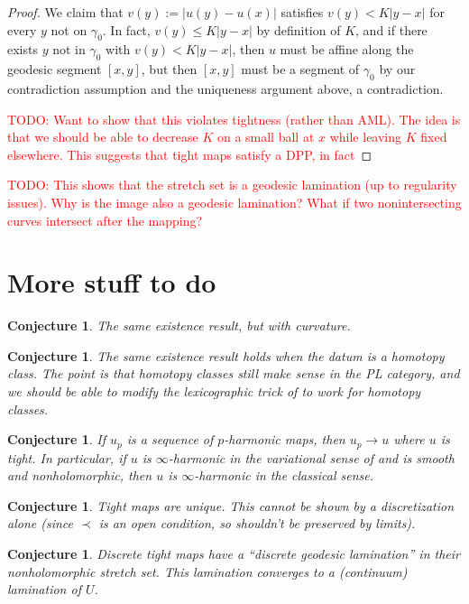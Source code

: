 \documentclass[reqno,11pt]{amsart}
\newtheorem{conjecture}[theorem]{Conjecture}
\theoremstyle{definition}
\numberwithin{equation}{section}
\newcommand\todo[1]{\textcolor{red}{TODO: #1}}
\begin{document}
\begin{proof}
We claim that $v(y) := |u(y) - u(x)|$ satisfies $v(y) < K|y - x|$ for every $y$ not on $\gamma_0$.
In fact, $v(y) \leq K|y - x|$ by definition of $K$, and if there exists $y$ not in $\gamma_0$ with $v(y) < K|y - x|$, then $u$ must be affine along the geodesic segment $[x, y]$, but then $[x, y]$ must be a segment of $\gamma_0$ by our contradiction assumption and the uniqueness argument above, a contradiction.

\todo{Want to show that this violates tightness (rather than AML).
The idea is that we should be able to decrease $K$ on a small ball at $x$ while leaving $K$ fixed elsewhere.
This suggests that tight maps satisfy a DPP, in fact}
\end{proof}

\todo{This shows that the stretch set is a geodesic lamination (up to regularity issues).
Why is the image also a geodesic lamination? What if two nonintersecting curves intersect after the mapping?}


\section{More stuff to do}
\begin{conjecture}
The same existence result, but with curvature.
\end{conjecture}

\begin{conjecture}
The same existence result holds when the datum is a homotopy class.
The point is that homotopy classes still make sense in the PL category, and we should be able to modify the lexicographic trick of \cite[Theorem 1.2]{Sheffield12} to work for homotopy classes.
\end{conjecture}

\begin{conjecture}
If $u_p$ is a sequence of $p$-harmonic maps, then $u_p \to u$ where $u$ is tight.
In particular, if $u$ is $\infty$-harmonic in the variational sense of \cite{daskalopoulos2022} and is smooth and nonholomorphic, then $u$ is $\infty$-harmonic in the classical sense.
\end{conjecture}

\begin{conjecture}
Tight maps are unique. This cannot be shown by a discretization alone (since $\prec$ is an open condition, so shouldn't be preserved by limits).
\end{conjecture}

\begin{conjecture}
Discrete tight maps have a ``discrete geodesic lamination'' in their nonholomorphic stretch set.
This lamination converges to a (continuum) lamination of $U$.
\end{conjecture}
\end{document}
